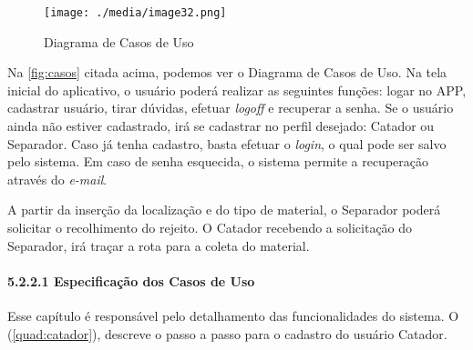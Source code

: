 
\begin{figure}[H]
	\begin{Center}
		\texttt{[image: ./media/image32.png]}
	\end{Center}
	\caption{Diagrama de Casos de Uso}
	\label{fig:casos}
\end{figure}


Na \autoref{fig:casos} citada acima, podemos ver o Diagrama de Casos de Uso. Na tela inicial do aplicativo, o usuário poderá realizar as seguintes funções: logar no APP, cadastrar usuário, tirar dúvidas, efetuar \textit{logoff} e recuperar a senha. Se o usuário ainda não estiver cadastrado, irá se cadastrar no perfil desejado: Catador ou Separador. Caso já tenha cadastro, basta efetuar o \textit{login}, o qual pode ser salvo pelo sistema. Em caso de senha esquecida, o sistema permite a recuperação através do \textit{e-mail}.

A partir da inserção da localização e do tipo de material, o Separador poderá solicitar o recolhimento do rejeito. O Catador recebendo a solicitação do Separador, irá traçar a rota para a coleta do material. 

\paragraph*{5.2.2.1 Especificação dos Casos de Uso}

Esse capítulo é responsável pelo detalhamento das funcionalidades do sistema. O (\autoref{quad:catador}), descreve o passo a passo para o cadastro do usuário Catador.


